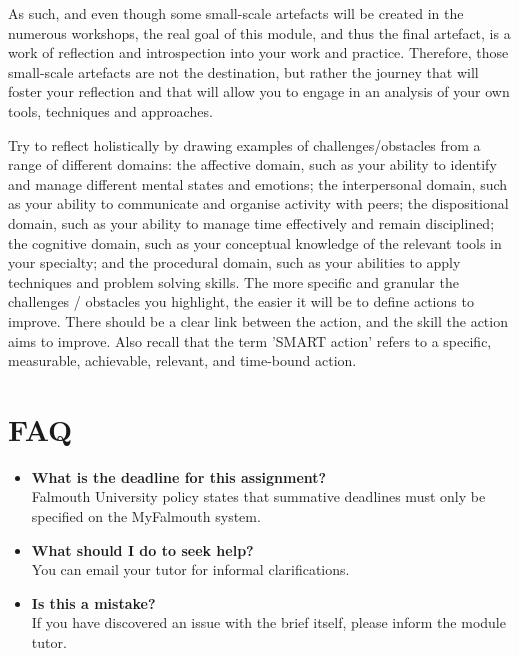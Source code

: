 \documentclass{../../fal_assignment}
\begin{document}
As such, and even though some small-scale artefacts will be created in the numerous workshops, the real goal of this module, and thus the final artefact, is a work of reflection and introspection into your work and practice. Therefore, those small-scale artefacts are not the destination, but rather the journey that will foster your reflection and that will allow you to engage in an analysis of your own tools, techniques and approaches.

Try to reflect holistically by drawing examples of challenges/obstacles from a range of different domains: the affective domain, such as your ability to identify and manage different mental states and emotions; the interpersonal domain, such as your ability to communicate and organise activity with peers; the dispositional domain, such as your ability to manage time effectively and remain disciplined; the cognitive domain, such as your conceptual knowledge of the relevant tools in your specialty; and the procedural domain, such as your abilities to apply techniques and problem solving skills. The more specific and granular the challenges / obstacles you highlight, the easier it will be to define actions to improve. There should be a clear link between the action, and the skill the action aims to improve. Also recall that the term ’SMART action’ refers to a specific, measurable, achievable, relevant, and time-bound action.

\pagebreak
\section*{FAQ}

\begin{itemize}
	\item 	\textbf{What is the deadline for this assignment?} \\ 
    		Falmouth University policy states that summative deadlines must only be specified on the MyFalmouth system.
	\item 	\textbf{What should I do to seek help?} \\ 
    		You can email your tutor for informal clarifications.    		
    	\item 	\textbf{Is this a mistake?} \\ 	
    		If you have discovered an issue with the brief itself, please inform the module tutor.
\end{itemize}
\end{document}
